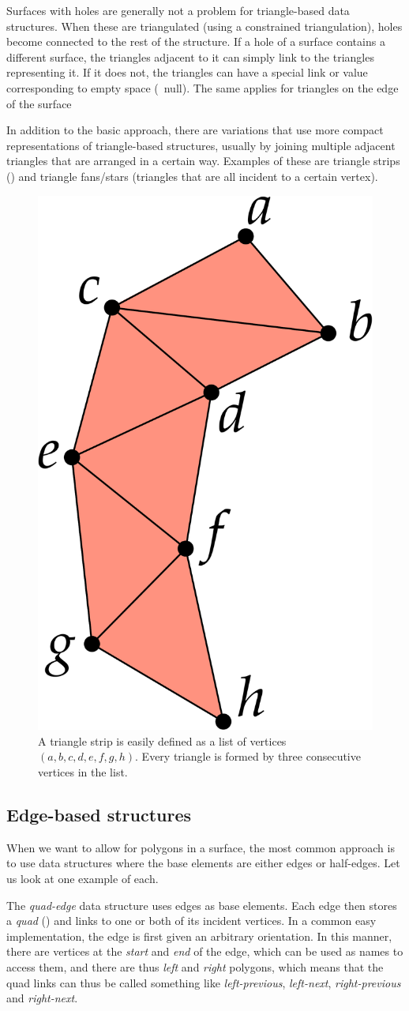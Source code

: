Surfaces with holes are generally not a problem for triangle-based data structures.
When these are triangulated (using a constrained triangulation), holes become connected to the rest of the structure.
If a hole of a surface contains a different surface, the triangles adjacent to it can simply link to the triangles representing it.
If it does not, the triangles can have a special link or value corresponding to empty space (\eg\ null).
The same applies for triangles on the edge of the surface

In addition to the basic approach, there are variations that use more compact representations of triangle-based structures, usually by joining multiple adjacent triangles that are arranged in a certain way.
Examples of these are triangle strips () and triangle fans/stars (triangles that are all incident to a certain vertex).

\begin{figure}
\centering
\includegraphics[width=0.2\linewidth]{figs/trianglestrip}
\caption{A triangle strip is easily defined as a list of vertices \((a,b,c,d,e,f,g,h)\). Every triangle is formed by three consecutive vertices in the list.}%
\label{fig:trianglestrip}
\end{figure}

\subsection{Edge-based structures}

When we want to allow for polygons in a surface, the most common approach is to use data structures where the base elements are either edges or half-edges.
Let us look at one example of each.

The \emph{quad-edge} data structure uses edges as base elements.
Each edge then stores a \emph{quad} () and links to one or both of its incident vertices.
In a common easy implementation, the edge is first given an arbitrary orientation.
In this manner, there are vertices at the \emph{start} and \emph{end} of the edge, which can be used as names to access them, and there are thus \emph{left} and \emph{right} polygons, which means that the quad links can thus be called something like \emph{left-previous}, \emph{left-next}, \emph{right-previous} and \emph{right-next}.

